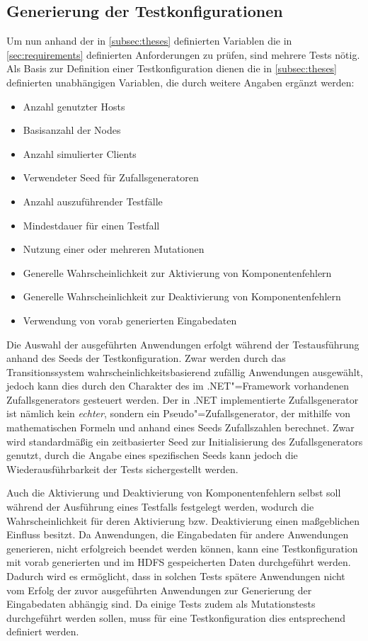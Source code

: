 \subsection{Generierung der Testkonfigurationen}
\label{subsec:testcaseGeneration}

Um nun anhand der in \cref{subsec:theses} definierten Variablen die in \cref{sec:requirements} definierten Anforderungen zu prüfen, sind mehrere Tests nötig.
Als Basis zur Definition einer Testkonfiguration dienen die in \cref{subsec:theses} definierten unabhängigen Variablen, die durch weitere Angaben ergänzt werden:

\begin{itemize}
    \item Anzahl genutzter Hosts
    \item Basisanzahl der Nodes
    \item Anzahl simulierter Clients
    \item Verwendeter Seed für Zufallsgeneratoren
    \item Anzahl auszuführender Testfälle
    \item Mindestdauer für einen Testfall
    \item Nutzung einer oder mehreren Mutationen
    \item Generelle Wahrscheinlichkeit zur Aktivierung von Komponentenfehlern
    \item Generelle Wahrscheinlichkeit zur Deaktivierung von Komponentenfehlern
    \item Verwendung von vorab generierten Eingabedaten
\end{itemize}

Die Auswahl der ausgeführten Anwendungen erfolgt während der Testausführung anhand des Seeds der Testkonfiguration.
Zwar werden durch das Transitionssystem wahrscheinlichkeitsbasierend zufällig Anwendungen ausgewählt, jedoch kann dies durch den Charakter des im .NET"=Framework vorhandenen Zufallsgenerators gesteuert werden.
Der in .NET implementierte Zufallsgenerator ist nämlich kein \emph{echter}, sondern ein Pseudo"=Zufallsgenerator, der mithilfe von mathematischen Formeln und anhand eines Seeds Zufallszahlen berechnet.
Zwar wird standardmäßig ein zeitbasierter Seed zur Initialisierung des Zufallsgenerators genutzt, durch die Angabe eines spezifischen Seeds kann jedoch die Wiederausführbarkeit der Tests sichergestellt werden.

Auch die Aktivierung und Deaktivierung von Komponentenfehlern selbst soll während der Ausführung eines Testfalls festgelegt werden, wodurch die Wahrscheinlichkeit für deren Aktivierung bzw. Deaktivierung einen maßgeblichen Einfluss besitzt.
Da Anwendungen, die Eingabedaten für andere Anwendungen generieren, \uU nicht erfolgreich beendet werden können, kann eine Testkonfiguration mit vorab generierten und im \ac{HDFS} gespeicherten Daten durchgeführt werden.
Dadurch wird es ermöglicht, dass in solchen Tests spätere Anwendungen nicht vom Erfolg der zuvor ausgeführten Anwendungen zur Generierung der Eingabedaten abhängig sind.
Da einige Tests zudem als Mutationstests durchgeführt werden sollen, muss für eine Testkonfiguration dies entsprechend definiert werden.

